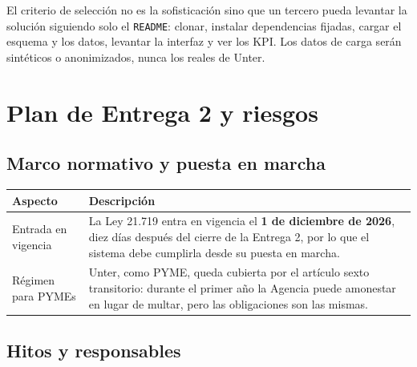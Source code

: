 \documentclass{article}
\begin{document}
El criterio de selección no es la sofisticación sino que un tercero pueda levantar la solución siguiendo solo el \texttt{README}: clonar, instalar dependencias fijadas, cargar el esquema y los datos, levantar la interfaz y ver los KPI. Los datos de carga serán sintéticos o anonimizados, nunca los reales de Unter.

\section{Plan de Entrega 2 y riesgos}

\subsection{Marco normativo y puesta en marcha}

\begin{table}[H]
\centering
\small
\renewcommand{\arraystretch}{1.2}
\begin{tabularx}{\textwidth}{@{}p{}L@{}}
\toprule
\textbf{Aspecto} & \textbf{Descripción} \\
\midrule
Entrada en vigencia & La Ley 21.719 entra en vigencia el \textbf{1 de diciembre de 2026}, diez días después del cierre de la Entrega 2, por lo que el sistema debe cumplirla desde su puesta en marcha. \\
\addlinespace
Régimen para PYMEs & Unter, como PYME, queda cubierta por el artículo sexto transitorio: durante el primer año la Agencia puede amonestar en lugar de multar, pero las obligaciones son las mismas. \\
\bottomrule
\end{tabularx}
\end{table}

\subsection{Hitos y responsables}
\end{document}
